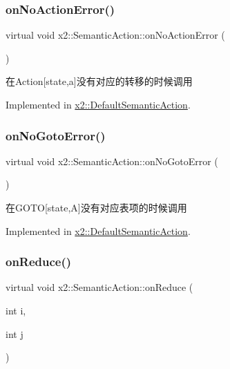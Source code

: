 \subsubsection{\texorpdfstring{on\+No\+Action\+Error()}{onNoActionError()}}
{\footnotesize\ttfamily virtual void x2\+::\+Semantic\+Action\+::on\+No\+Action\+Error (\begin{DoxyParamCaption}{ }\end{DoxyParamCaption})\hspace{0.3cm}{\ttfamily [pure virtual]}}

在\+Action\mbox{[}state,a\mbox{]}没有对应的转移的时候调用 

Implemented in \hyperlink{classx2_1_1_default_semantic_action_a6485fcbff1d9b9d63d40112d8887790d}{x2\+::\+Default\+Semantic\+Action}.

\mbox{\label{classx2_1_1_semantic_action_a00d94c579c5962c74ccd5ee6bc9ef70c}} 
\subsubsection{\texorpdfstring{on\+No\+Goto\+Error()}{onNoGotoError()}}
{\footnotesize\ttfamily virtual void x2\+::\+Semantic\+Action\+::on\+No\+Goto\+Error (\begin{DoxyParamCaption}{ }\end{DoxyParamCaption})\hspace{0.3cm}{\ttfamily [pure virtual]}}

在\+G\+O\+TO\mbox{[}state,A\mbox{]}没有对应表项的时候调用 

Implemented in \hyperlink{classx2_1_1_default_semantic_action_acbd05d5f08396b9df966494bd4422a54}{x2\+::\+Default\+Semantic\+Action}.

\mbox{\label{classx2_1_1_semantic_action_a859c5de657a2c684fef66e04a324e980}} 
\subsubsection{\texorpdfstring{on\+Reduce()}{onReduce()}}
{\footnotesize\ttfamily virtual void x2\+::\+Semantic\+Action\+::on\+Reduce (\begin{DoxyParamCaption}\item[{int}]{i,  }\item[{int}]{j }\end{DoxyParamCaption})\hspace{0.3cm}{\ttfamily [pure virtual]}}

